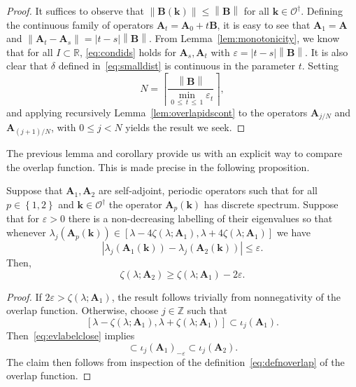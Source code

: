 \documentclass[AHL,Unicode,longabstracts,published]{cedram}
\newcommand{\R}{\mathbb R}
\newcommand{\Z}{\mathbb Z}
\newcommand{\CO}{\mathcal{O}}
\newcommand{\BA}{\mathbf A}
\newcommand{\BB}{\mathbf B}
\newcommand{\bk}{\mathbf k}
\newcommand{\eps}{\varepsilon}
\newcommand{\ceil}[1]{\left\lceil#1\right\rceil}
\newcommand{\abs}[1]{\left\lvert #1 \right\rvert}
\newcommand{\set}[1]{\left\{ #1 \right\}}
\newcommand{\norm}[1]{\left\| #1 \right\|}
\begin{document}
\begin{proof}
It suffices to observe that $\norm{\BB(\bk)} \le \norm{\BB}$ for all $\bk \in
\CO^\dagger$. Defining the continuous family of operators $\BA_t = \BA_0 + t \BB$, it is easy to see that $\BA_1 = \BA$ and $\norm{\BA_t - \BA_s} = \abs{t-s}\norm \BB$. From Lemma~\ref{lem:monotonicity}, we know that for all $I \subset \R$, \eqref{eq:condids} holds for $\BA_s,\BA_t$ with $\eps = \abs{t-s}\norm \BB$. It is also clear that $\delta$ defined in~\eqref{eq:smalldist} is continuous in the parameter $t$. Setting
\begin{equation}
N = \ceil{\frac{\norm \BB}{\min_{0\,\le\,t \,\le\,1} \eps_t}},
\end{equation}
and applying recursively Lemma~\ref{lem:overlapidscont} to the operators $\BA_{j/N}$ and $\BA_{(j+1)/N}$, with $0 \le j < N$ yields the result we seek.
\end{proof}

The previous lemma and corollary provide us with an explicit way to compare the overlap function. This is made precise in the following proposition.

\begin{prop}\label{prop:overlapcontev}
Suppose that $\BA_1,\BA_2$ are self-adjoint, periodic operators such that for all $p \in \set{1,2}$ and $\bk \in \CO^\dagger$ the operator $\BA_p(\bk)$ has discrete spectrum. Suppose that for $\eps > 0$ there is a non-decreasing labelling of their eigenvalues so that whenever $\lambda_j(\BA_p(\bk)) \in [\lambda - 4\zeta(\lambda;\BA_1), \lambda + 4\zeta(\lambda;\BA_1)]$ we have
\begin{equation}\label{eq:evlabelclose}
\left|\lambda_j(\BA_1(\bk)) - \lambda_j(\BA_2(\bk))\right| \le \eps.
\end{equation}
Then,
\begin{equation}
\zeta(\lambda;\BA_2) \ge \zeta(\lambda;\BA_1) - 2\eps.
\end{equation}
\end{prop}

\begin{proof}
If $2\eps > \zeta(\lambda;\BA_1)$, the result follows trivially from nonnegativity of the overlap function. Otherwise, choose $j \in \Z$ such that
\[
\left[\lambda -
\zeta(\lambda;\BA_1),\lambda + \zeta(\lambda;\BA_1)\right] \subset \iota_j(\BA_1).
\]
Then~\eqref{eq:evlabelclose} implies
\begin{equation}
[\lambda - \zeta(\lambda;\BA_1) + \eps,\lambda + \zeta(\lambda;\BA_1) - \eps]
\subset \iota_j(\BA_1)_{-\eps} \subset \iota_j(\BA_2).
\end{equation}
The claim then follows from inspection of the definition~\eqref{eq:defnoverlap} of the overlap function.
\end{proof}
\end{document}
